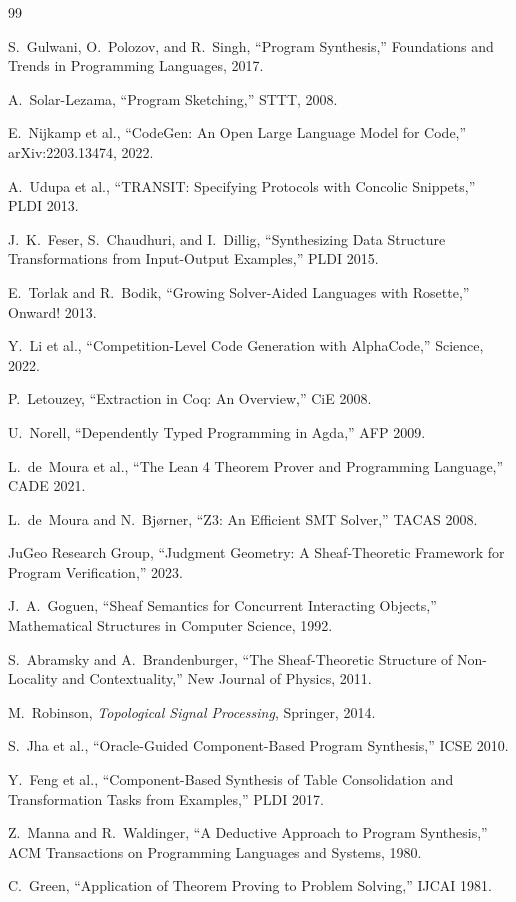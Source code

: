 \documentclass[11pt]{article}
\begin{document}
\begin{thebibliography}{99}

S.~Gulwani, O.~Polozov, and R.~Singh, ``Program Synthesis,''
Foundations and Trends in Programming Languages, 2017.

A.~Solar-Lezama, ``Program Sketching,'' STTT, 2008.

E.~Nijkamp et al., ``CodeGen: An Open Large Language Model for Code,''
arXiv:2203.13474, 2022.

A.~Udupa et al., ``TRANSIT: Specifying Protocols with Concolic Snippets,''
PLDI 2013.

J.~K.~Feser, S.~Chaudhuri, and I.~Dillig, ``Synthesizing Data Structure
Transformations from Input-Output Examples,'' PLDI 2015.

E.~Torlak and R.~Bodik, ``Growing Solver-Aided Languages with Rosette,''
Onward! 2013.

Y.~Li et al., ``Competition-Level Code Generation with AlphaCode,''
Science, 2022.

P.~Letouzey, ``Extraction in Coq: An Overview,'' CiE 2008.

U.~Norell, ``Dependently Typed Programming in Agda,'' AFP 2009.

L.~de~Moura et al., ``The Lean 4 Theorem Prover and Programming Language,''
CADE 2021.

L.~de~Moura and N.~Bjørner, ``Z3: An Efficient SMT Solver,'' TACAS 2008.

JuGeo Research Group, ``Judgment Geometry: A Sheaf-Theoretic Framework for
Program Verification,'' 2023.

J.~A.~Goguen, ``Sheaf Semantics for Concurrent Interacting Objects,''
Mathematical Structures in Computer Science, 1992.

S.~Abramsky and A.~Brandenburger, ``The Sheaf-Theoretic Structure of
Non-Locality and Contextuality,'' New Journal of Physics, 2011.

M.~Robinson, \emph{Topological Signal Processing}, Springer, 2014.

S.~Jha et al., ``Oracle-Guided Component-Based Program Synthesis,''
ICSE 2010.

Y.~Feng et al., ``Component-Based Synthesis of Table Consolidation and
Transformation Tasks from Examples,'' PLDI 2017.

Z.~Manna and R.~Waldinger, ``A Deductive Approach to Program Synthesis,''
ACM Transactions on Programming Languages and Systems, 1980.

C.~Green, ``Application of Theorem Proving to Problem Solving,''
IJCAI 1981.

\end{thebibliography}
\end{document}
